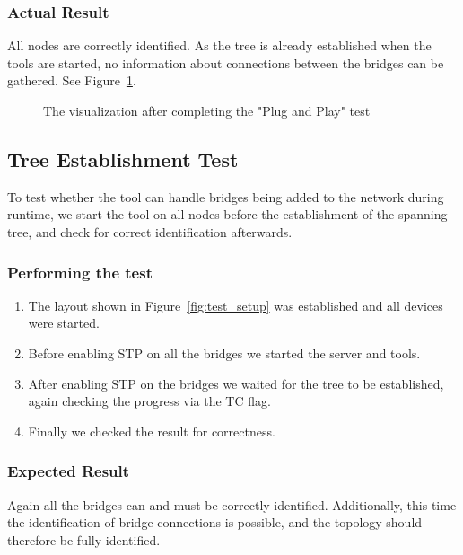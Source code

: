 \subsubsection*{Actual Result}
All nodes are correctly identified.
As the tree is already established when the tools are started, no information about connections between the bridges can be gathered.
See Figure~\ref{fig:pnp}.
\begin{figure}[h]
    \centering
    \caption{The visualization after completing the "Plug and Play" test}
    \label{fig:pnp}
\end{figure}

\subsection*{Tree Establishment Test}
\label{tree_est_test}
To test whether the tool can handle bridges being added to the network during runtime, we start the tool on all nodes before the establishment of the spanning tree, and check for correct identification afterwards.

\subsubsection*{Performing the test}
\begin{enumerate}
    \item The layout shown in Figure~\ref{fig:test_setup} was established and all devices were started.
    \item Before enabling STP on all the bridges we started the server and tools.
    \item After enabling STP on the bridges we waited for the tree to be established, again checking the progress via the TC flag.
    \item Finally we checked the result for correctness.
\end{enumerate}

\subsubsection*{Expected Result}
Again all the bridges can and must be correctly identified.
Additionally, this time the identification of bridge connections is possible, and the topology should therefore be fully identified.

